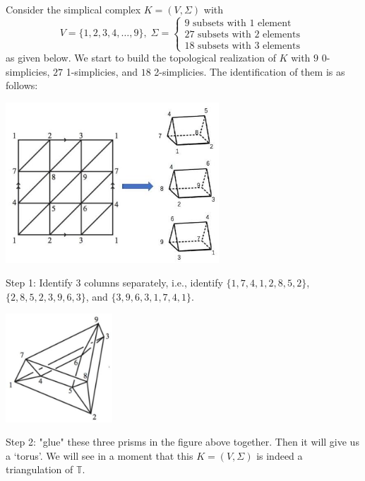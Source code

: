 \begin{example} \label{eg:tours_triangulation}
Consider the simplical complex \(K = \left( {V,\Sigma }\right)\) with
\[
V = \{ 1,2,3,4,\ldots,9\},\;\Sigma  = \left\{  \begin{array}{r} 9\text{ subsets with }1\text{ element } \\  {27}\text{ subsets with }2\text{ elements } \\  {18}\text{ subsets with }3\text{ elements } \end{array}\right.
\]
as given below. We start to build the topological realization of \(K\) with $9$ 0-simplicies, $27$ 1-simplicies, and $18$ 2-simplicies. The identification of them is as follows:
\begin{center}
\includegraphics[width=0.6\textwidth]{images/Ch4_torus_triangle.jpg}
\end{center}
Step 1: Identify 3 columns separately, i.e., identify \(\{ 1,7,4,1,2,8,5,2\}\), \(\{ 2,8,5,2,3,9,6,3\}\), and \(\{ 3,9,6,3,1,7,4,1\}\).

\begin{center}
\includegraphics[width=0.3\textwidth]{images/Ch4_torus_triangle2.jpg}
\end{center}
Step 2: "glue" these three prisms in the figure above together. Then it will give us a `torus'. We will see in a moment that this $K = (V,\Sigma)$ is indeed a triangulation of $\mathbb{T}$.
\end{example}

